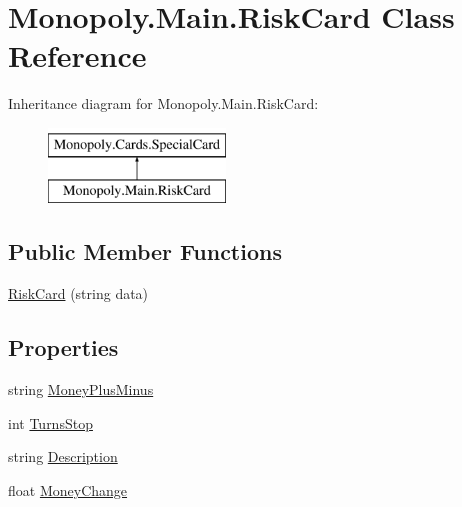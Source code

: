 \hypertarget{class_monopoly_1_1_main_1_1_risk_card}{}\section{Monopoly.\+Main.\+Risk\+Card Class Reference}
\label{class_monopoly_1_1_main_1_1_risk_card}
Inheritance diagram for Monopoly.\+Main.\+Risk\+Card\+:\begin{figure}[H]
\begin{center}
\leavevmode
\includegraphics[height=2.000000cm]{class_monopoly_1_1_main_1_1_risk_card}
\end{center}
\end{figure}
\subsection*{Public Member Functions}
\begin{DoxyCompactItemize}
\item 
\mbox{\hyperlink{class_monopoly_1_1_main_1_1_risk_card_a58d785940968e2fcf8de364bab752a92}{Risk\+Card}} (string data)
\end{DoxyCompactItemize}
\subsection*{Properties}
\begin{DoxyCompactItemize}
\item 
string \mbox{\hyperlink{class_monopoly_1_1_main_1_1_risk_card_a67f6745645c48a905f16ab26511f7570}{Money\+Plus\+Minus}}
\item 
int \mbox{\hyperlink{class_monopoly_1_1_main_1_1_risk_card_a94f9afd3ab506cf0d96469b0b35f16b5}{Turns\+Stop}}
\item 
string \mbox{\hyperlink{class_monopoly_1_1_cards_1_1_special_card_a7404d6bf23aa3858a8831075162bcb66}{Description}}
\item 
float \mbox{\hyperlink{class_monopoly_1_1_cards_1_1_special_card_ab81aa9650e34745aa35b313730a8c0c4}{Money\+Change}}
\end{DoxyCompactItemize}


